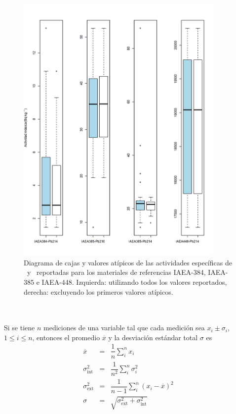 \begin{figure}
\centering 
\includegraphics[width=0.9\textwidth]{Imagenes/PlotOutliers-2-IAEA-All.png}
\caption{Diagrama de cajas y valores atípicos de las actividades específicas de \PbCero\, y \PbCuatro\, reportadas para los materiales de referencias IAEA-384, IAEA-385 e IAEA-448. Izquierda: utilizando todos los valores reportados, derecha: excluyendo los primeros valores atípicos. }\label{Fig-OutMRC-2}
\end{figure}
\\
\\
Si se tiene $n$ mediciones de una variable tal que cada medición sea $x_i \pm \sigma_i$, $1\leq i\leq n$, entonces el promedio $\overline{x}$ y la desviación estándar total $\sigma$ es
\begin{eqnarray}
\overline{x} &=& \dfrac{1}{n}\sum_i^n x_i \\
\sigma^2_\text{int} &=& \dfrac{1}{n^2} \sum_i^n \sigma_i^2 \\
\sigma^2_\text{ext} &=& \dfrac{1}{n-1}\sum_i^n (x_i-\overline{x})^2 \\
\sigma &=& \sqrt{\sigma^2_\text{ext}  + \sigma^2_\text{int}}
\end{eqnarray}
